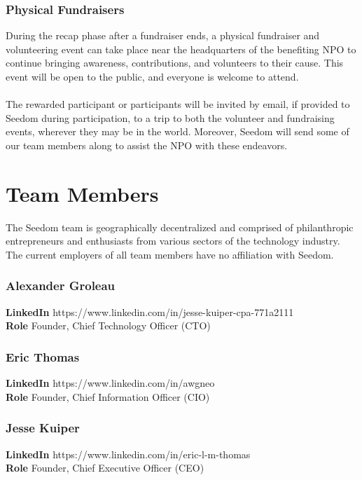 \documentclass[11pt]{article}
\begin{document}
\subsubsection{Physical Fundraisers}

During the recap phase after a fundraiser ends, a physical fundraiser and volunteering event can take place near the headquarters of the benefiting NPO to continue bringing awareness, contributions, and volunteers to their cause. This event will be open to the public, and everyone is welcome to attend.\\\\
The rewarded participant or participants will be invited by email, if provided to Seedom during participation, to a trip to both the volunteer and fundraising events, wherever they may be in the world. Moreover, Seedom will send some of our team members along to assist the NPO with these endeavors.

\section{Team Members}

The Seedom team is geographically decentralized and comprised of philanthropic entrepreneurs and enthusiasts from various sectors of the technology industry. The current employers of all team members have no affiliation with Seedom.

\subsubsection{Alexander Groleau}
\begin{minipage}{\textwidth}
\textbf{LinkedIn} https://www.linkedin.com/in/jesse-kuiper-cpa-771a2111\\
\textbf{Role} Founder, Chief Technology Officer (CTO)\\
\end{minipage}

\subsubsection{Eric Thomas}
\begin{minipage}{\textwidth}
\textbf{LinkedIn} https://www.linkedin.com/in/awgneo\\
\textbf{Role} Founder, Chief Information Officer (CIO)\\
\end{minipage}

\subsubsection{Jesse Kuiper}
\begin{minipage}{\textwidth}
\textbf{LinkedIn} https://www.linkedin.com/in/eric-l-m-thomas\\
\textbf{Role} Founder, Chief Executive Officer (CEO)\\
\end{minipage}
\end{document}
